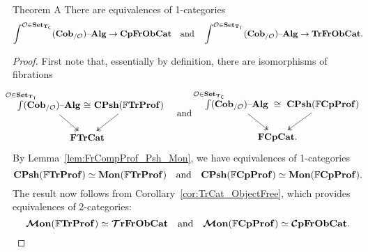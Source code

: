 \documentclass[11pt,oneside,article]{memoir}
\begin{document}
\begin{named}{Theorem A}
      \label{thm:TheoremA}
  There are equivalences of 1-categories
  \begin{equation*}
     \int^{\mathcal{O}\in\mathbf{Set}_{\mathbf{T}_{\mathsf{C}}}}(\mathbf{Cob}_{/\mathcal{O}}){\text \textendash}\mathbf{Alg} \to \mathbf{CpFrObCat}\quad\text{and}\quad\int^{\mathcal{O}\in\mathbf{Set}_{\mathbf{T}_{\mathsf{T}}}}(\mathbf{Cob}_{/\mathcal{O}}){\text \textendash}\mathbf{Alg} \to \mathbf{TrFrObCat}.
  \end{equation*}
\end{named}
\begin{proof}
   First note that, essentially by definition, there are isomorphisms of fibrations
   \begin{equation*}
      \begin{tikzcd}[column sep=-2em]
         \int\limits^{\mathclap{\LabSet\in\Set_{\TT}}}(\LCob{\LabSet})\alg
               \ar[rr,phantom,"\iso"] \ar[dr,two heads]
            && \CPsh(\dFrTrProf) \ar[dl,two heads] \\
         & \FrTrCat &
      \end{tikzcd}
      \quad\text{and}\quad
      \begin{tikzcd}[column sep=-2em]
         \int\limits^{\mathclap{\LabSet\in\Set_{\TC}}}(\LCob{\LabSet})\alg
               \ar[rr,phantom,"\iso"] \ar[dr,two heads]
            && \CPsh(\dFrCompProf) \ar[dl,two heads] \\
         & \FrCompCat. &
      \end{tikzcd}
   \end{equation*}
   By Lemma~\ref{lem:FrCompProf_Psh_Mon}, we have equivalences of 1-categories
   \begin{equation}
      \mathbf{CPsh}(\mathbb{F}\mathbf{TrProf})\simeq\mathbf{Mon}(\mathbb{F}\mathbf{TrProf})
      \quad\text{and}\quad
      \mathbf{CPsh}(\mathbb{F}\mathbf{CpProf})\simeq\mathbf{Mon}(\mathbb{F}\mathbf{CpProf}).
   \end{equation}
   The result now follows from Corollary~\ref{cor:TrCat_ObjectFree}, which provides equivalences of
   2-categories:
   \[
      \bm{\mathcal{M}}\mathbf{on}(\mathbb{F}\mathbf{TrProf})\simeq\bm{\mathcal{T}}\mathbf{rFrObCat}
      \quad\text{and}\quad
      \bm{\mathcal{M}}\mathbf{on}(\mathbb{F}\mathbf{CpProf})\simeq\bm{\mathcal{C}}\mathbf{pFrObCat}.
   \]
\end{proof}
\end{document}
